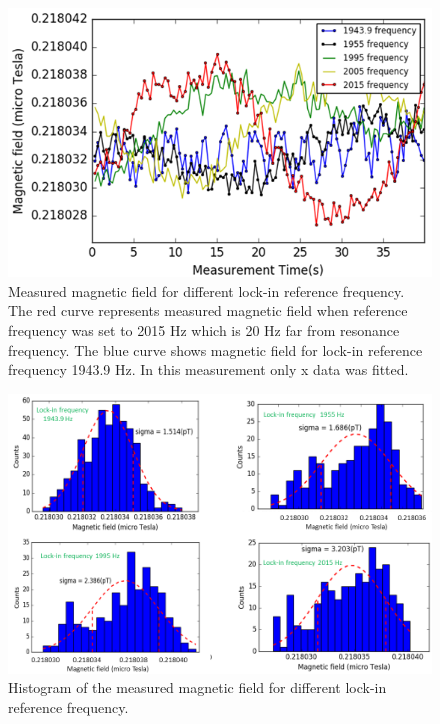 \begin{figure}[h]
\centering\includegraphics[width=0.8\linewidth]{figures/reference_frequency}
\caption{Measured magnetic field for different lock-in reference frequency. The red curve represents measured magnetic field when reference frequency was set to 2015 Hz which is 20 Hz far from resonance frequency. The blue curve shows magnetic field for lock-in reference frequency 1943.9 Hz. In this measurement only x data was fitted. \label{fig:field for different lockin ref freq}}
\end{figure}
   

\begin{figure}[h]
\centering\includegraphics[width=0.8\linewidth]{figures/sigma_diff_lock-in_frequency.png}
\caption{Histogram of the measured magnetic field for different lock-in reference frequency.\label{histogram-of-diff-lock-in freq}}
\end{figure}


